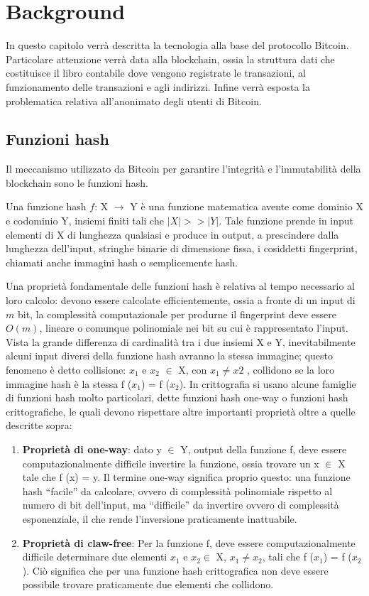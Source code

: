 \chapter{Background}
In questo capitolo verrà descritta la tecnologia alla base del protocollo Bitcoin. Particolare attenzione verrà data alla blockchain, ossia la struttura dati che costituisce il libro contabile dove vengono registrate le transazioni, al funzionamento delle transazioni e agli indirizzi. Infine verrà esposta la problematica relativa all'anonimato degli utenti di Bitcoin. 
\section{Funzioni hash}
Il meccanismo utilizzato da Bitcoin per garantire l'integrità e l'immutabilità della  blockchain sono le funzioni hash.

Una funzione hash $f$: X $\longrightarrow$ Y è una funzione matematica avente come dominio X e codominio Y, insiemi finiti tali che $|X| >> |Y |$. Tale funzione prende in input elementi di X di lunghezza qualsiasi e produce in output, a prescindere dalla lunghezza dell’input, stringhe binarie di dimensione fissa, i cosiddetti fingerprint, chiamati anche immagini hash o semplicemente hash.

Una proprietà fondamentale delle funzioni hash è relativa al tempo necessario al loro calcolo: devono essere calcolate efficientemente, ossia a fronte di un input di $m$ bit, la complessità computazionale per produrne il fingerprint deve essere $O(m)$, lineare o comunque polinomiale nei bit su cui è rappresentato l’input.
Vista la grande differenza di cardinalità tra i due insiemi X e Y, inevitabilmente alcuni input diversi della funzione hash avranno la stessa immagine; questo fenomeno è detto collisione: $x_1$ e $x_2$ $\in$ X, con $x_1 \neq x2$ , collidono se la loro immagine hash è la stessa f ($x_1$) = f ($x_2$).
In crittografia si usano alcune famiglie di funzioni hash molto particolari, dette funzioni hash one-way o funzioni hash crittografiche, le quali devono rispettare altre importanti proprietà oltre a quelle descritte sopra:
\begin{enumerate}
    \item \textbf{Proprietà di one-way}: dato y $\in$ Y, output della funzione f, deve essere computazionalmente difficile invertire la funzione, ossia trovare un x $\in$ X tale che f (x) = y. Il termine one-way significa proprio questo: una funzione hash ``facile” da calcolare, ovvero di complessità polinomiale rispetto al numero di bit dell’input, ma ``difficile” da invertire ovvero di complessità esponenziale, il che rende l’inversione praticamente inattuabile.
    \item \textbf{Proprietà di claw-free}: Per la funzione f, deve essere computazionalmente difficile determinare due elementi $x_1$ e $x_2 \in$ X, $x_1 \neq x_2$, tali che f ($x_1$) = f ($x_2$). Ciò significa che per una funzione hash crittografica non deve essere possibile trovare praticamente due elementi che collidono.
\end{enumerate}
